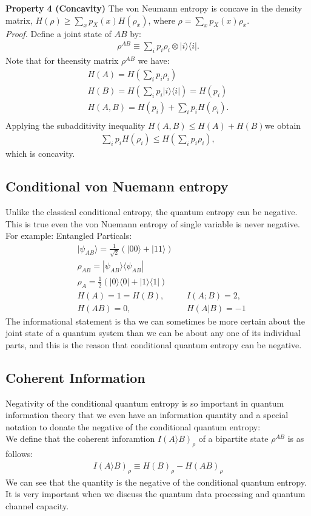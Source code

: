 \textbf{Property 4 (Concavity)}
The von Neumann entropy is concave in the density matrix, $H(\rho) \geq \sum_x p_X(x) H(\rho_x)$, where $\rho = \sum_x p_X(x)\rho_x$. \\
\textit{Proof.} Define a joint state of $AB$ by:
\begin{align*}
\rho^{AB} \equiv \sum_i p_i \rho_i \otimes |i\rangle \langle i|.
\end{align*}
Note that for theensity matrix $\rho^{AB}$ we have:
\begin{align*}
H(A)=H(\sum_i p_i \rho_i) \\
H(B)=H(\sum_i p_i |i \rangle \langle i|)=H(p_i) \\
H(A,B)=H(p_i)+\sum_i p_i H(\rho_i). \\
\end{align*}
Applying the subadditivity inequality $H(A,B) \leq H(A)+H(B)$we obtain
\begin{align*}
\sum_i p_i H(\rho_i) \leq H(\sum_i p_i \rho_i),
\end{align*}
which is concavity.

\subsection{Conditional von Nuemann entropy}
Unlike the classical conditional entropy, the quantum entropy can be negative. This is true even the von Nuemann entropy of single variable is never negative. \\
For example:
Entangled Particals:
\begin{align*}
& |\psi_{AB} \rangle = \frac{1}{\sqrt{2}}(|00\rangle + |11\rangle) \\
& \rho_{AB}= |\psi_{AB} \rangle \langle \psi_{AB}| \\
& \rho_A=\frac{1}{2}(|0\rangle \langle 0| + |1\rangle \langle 1|) \\
& H(A)=1=H(B), & &I(A;B)=2,  \\
& H(AB)=0, & &H(A|B)=-1 
\end{align*}
The informational statement is tha we can sometimes be more certain about the joint state of a quantum system than we can be about any one of its individual parts, and this is the reason that conditional  quantum entropy can be negative.

\subsection{Coherent Information}
Negativity of the conditional quantum entropy is so important in quantum information theory that we even have an information quantity and a special notation to donate the negative of the conditional quantum entropy:\\
We define that the coherent inforamtion $I(A\rangle B)_{\rho}$ of a bipartite state $\rho^{AB}$ is as follows:
\begin{align*}
I(A\rangle B)_{\rho} \equiv H(B)_{\rho}-H(AB)_{\rho}
\end{align*}
We can see that the quantity is the negative of the conditional quantum entropy. It is very important when we discuss the quantum data processing and quantum channel capacity.

